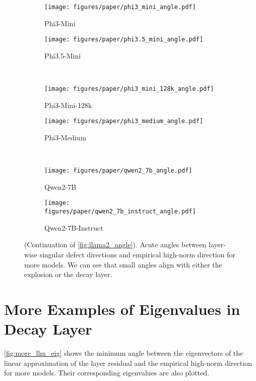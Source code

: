 \begin{figure*}[!t]
    \begin{subfigure}[t]{0.49\textwidth}
        \texttt{[image: figures/paper/phi3\_mini\_angle.pdf]}
        \caption{Phi3-Mini}\label{fig:phi3_mini_angle}
    \end{subfigure}
    \begin{subfigure}[t]{0.49\textwidth}
        \texttt{[image: figures/paper/phi3.5\_mini\_angle.pdf]}
        \caption{Phi3.5-Mini}\label{fig:phi3.5_mini_angle}
    \end{subfigure}\\
    \begin{subfigure}[t]{0.49\textwidth}
        \texttt{[image: figures/paper/phi3\_mini\_128k\_angle.pdf]}
        \caption{Phi3-Mini-128k}\label{fig:phi3_mini_128k_angle}
    \end{subfigure}
    \begin{subfigure}[t]{0.49\textwidth}
        \texttt{[image: figures/paper/phi3\_medium\_angle.pdf]}
        \caption{Phi3-Medium}\label{fig:phi3_medium_angle}
    \end{subfigure}\\
    \begin{subfigure}[t]{0.49\textwidth}
        \texttt{[image: figures/paper/qwen2\_7b\_angle.pdf]}
        \caption{Qwen2-7B}\label{fig:qwen2_7b_angle}
    \end{subfigure}
    \begin{subfigure}[t]{0.49\textwidth}
        \texttt{[image: figures/paper/qwen2\_7b\_instruct\_angle.pdf]}
        \caption{Qwen2-7B-Instruct}\label{fig:qwen2_7b_instruct_angle}
    \end{subfigure}
    \caption{(Continuation of \cref{fig:llama2_angle}).
    Acute angles between layer-wise singular defect directions and empirical high-norm direction for more models.
    We can see that small angles align with either the explosion or the decay layer.
    }\label{fig:more_llm_angle}
\end{figure*}

\section{More Examples of Eigenvalues in Decay Layer}\label{sec:more_diminish}

\cref{fig:more_llm_eig} shows the minimum angle between the eigenvectors of the linear approximation of the layer residual and the empirical high-norm direction for more models.
Their corresponding eigenvalues are also plotted.


